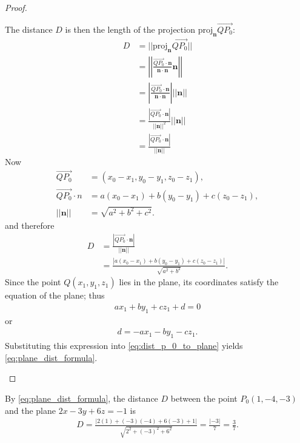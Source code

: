 \documentclass[12pt,letterpaper,reqno]{article}
\numberwithin{equation}{section}
\begin{document}
\begin{proof}
\begin{enumerate}[(a)]
		The distance $D$ is then the length of the projection $\text{proj}_{\mathbf{n}}\overrightarrow{QP_0}$:
		\begin{align*}
			D&=||\text{proj}_{\mathbf{n}}\overrightarrow{QP_0}|| \\
			&=\left|\left|\frac{\overrightarrow{QP_0}\cdot \mathbf{n}}{\mathbf{n}\cdot \mathbf{n}}\mathbf{n} \right|\right| \\
			&=\left|\frac{\overrightarrow{QP_0}\cdot \mathbf{n}}{\mathbf{n}\cdot \mathbf{n}}\right|||\mathbf{n}|| \\
			&=\frac{|\overrightarrow{QP_0}\cdot \mathbf{n}|}{||\mathbf{n}||^2}||\mathbf{n}|| \\
			&=\frac{|\overrightarrow{QP_0}\cdot \mathbf{n}|}{||\mathbf{n}||}
		\end{align*}
		Now
		\begin{align*}
			\overrightarrow{QP_0}&=(x_0-x_1,y_0-y_1,z_0-z_1), \\
			\overrightarrow{QP_0}\cdot{n}&=a(x_0-x_1)+b(y_0-y_1)+c(z_0-z_1), \\
			||\mathbf{n}||&=\sqrt{a^2+b^2+c^2}.
		\end{align*}
		and therefore
	\begin{align}\label{eq:dist_p_0_to_plane}
			D&=\frac{|\overrightarrow{QP_0}\cdot \mathbf{n}|}{||\mathbf{n}||}\\
			&=\frac{|a(x_0-x_1)+b(y_0-y_1)+c(z_0-z_1)|}{\sqrt{a^2+b^2}}.
		\end{align}
		Since the point $Q(x_1,y_1,z_1)$ lies in the plane, its coordinates satisfy the equation of the plane; thus
		\begin{align*}
			ax_1+by_1+cz_1+d=0
		\end{align*}
		or 
		\begin{align*}
			d=-ax_1-by_1-cz_1.
		\end{align*}
		Substituting this expression into \eqref{eq:dist_p_0_to_plane} yields \eqref{eq:plane_dist_formula}.
	\end{enumerate}
\end{proof}

\begin{example}
By \eqref{eq:plane_dist_formula}, the distance $D$ between the point $P_0(1,-4,-3)$ and the plane $2x-3y+6z=-1$ is
\begin{align*}
	D=\frac{|2(1)+(-3)(-4)+6(-3)+1|}{\sqrt{2^2+(-3)^2+6^2}}=\frac{|-3|}{7}=\frac{3}{7}.
\end{align*}	
\end{example}
\end{document}
